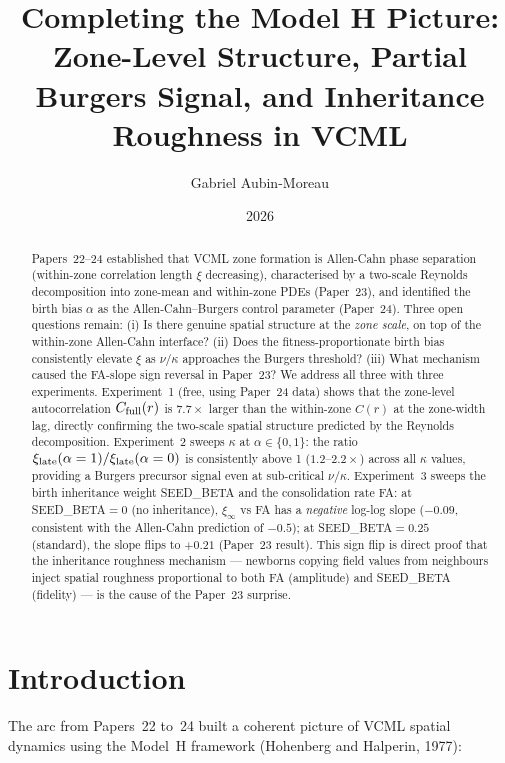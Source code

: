 \documentclass[11pt]{article}
\title{Completing the Model H Picture: Zone-Level Structure,
       Partial Burgers Signal, and Inheritance Roughness in VCML}
\author{Gabriel Aubin-Moreau}
\date{2026}
\begin{document}
\maketitle

\begin{abstract}
Papers~22--24 established that VCML zone formation is Allen-Cahn phase
separation (within-zone correlation length $\xi$ decreasing), characterised
by a two-scale Reynolds decomposition into zone-mean and within-zone PDEs
(Paper~23), and identified the birth bias $\alpha$ as the Allen-Cahn--Burgers
control parameter (Paper~24).
Three open questions remain:
(i) Is there genuine spatial structure at the \emph{zone scale}, on top of
    the within-zone Allen-Cahn interface?
(ii) Does the fitness-proportionate birth bias consistently elevate $\xi$
     as $\nu/\kappa$ approaches the Burgers threshold?
(iii) What mechanism caused the FA-slope sign reversal in Paper~23?
We address all three with three experiments.
Experiment~1 (free, using Paper~24 data) shows that the zone-level
autocorrelation $C_{\rm full}(r)$ is $7.7\times$ larger than the
within-zone $C(r)$ at the zone-width lag, directly confirming the
two-scale spatial structure predicted by the Reynolds decomposition.
Experiment~2 sweeps $\kappa$ at $\alpha \in \{0,1\}$: the ratio
$\xi_{\rm late}(\alpha=1)/\xi_{\rm late}(\alpha=0)$ is consistently
above 1 ($1.2$--$2.2\times$) across all $\kappa$ values, providing
a Burgers precursor signal even at sub-critical $\nu/\kappa$.
Experiment~3 sweeps the birth inheritance weight SEED\_BETA and the
consolidation rate FA: at SEED\_BETA$=0$ (no inheritance), $\xi_\infty$
vs FA has a \emph{negative} log-log slope ($-0.09$, consistent with the
Allen-Cahn prediction of $-0.5$); at SEED\_BETA$=0.25$ (standard), the
slope flips to $+0.21$ (Paper~23 result).
This sign flip is direct proof that the inheritance roughness mechanism
--- newborns copying field values from neighbours inject spatial
roughness proportional to both FA (amplitude) and SEED\_BETA (fidelity)
--- is the cause of the Paper~23 surprise.
\end{abstract}

\section{Introduction}

The arc from Papers~22 to~24 built a coherent picture of VCML spatial
dynamics using the Model~H framework (Hohenberg and Halperin, 1977):
\end{document}
